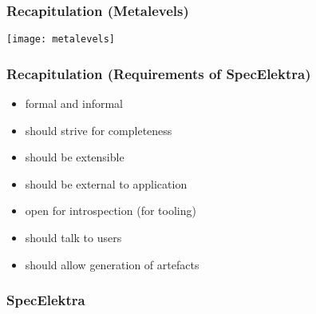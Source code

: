 \begin{frame}
	\frametitle{Recapitulation (Metalevels)}
	\texttt{[image: metalevels]}
\end{frame}

\begin{frame}
	\frametitle{Recapitulation (Requirements of SpecElektra)}

	\begin{itemize}
	\item formal and informal
	\item should strive for completeness
	\item should be extensible
	\item should be external to application
	\item open for introspection (for tooling)
	\item should talk to users
	\item should allow generation of artefacts
	\end{itemize}
\end{frame}

\begin{frame}
	\frametitle{SpecElektra}

	\fontsize{18}{0}\selectfont
\end{frame}


